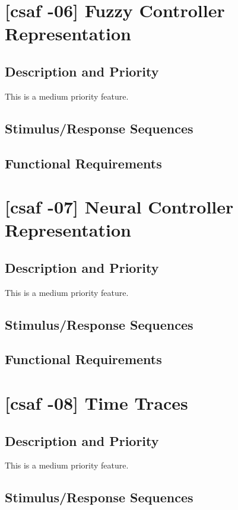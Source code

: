 \section{[\acrshort{csaf} -06] Fuzzy Controller Representation}

\subsection{Description and Priority}
This is a medium priority feature.

\subsection{Stimulus/Response Sequences}


\subsection{Functional Requirements}

\section{[\acrshort{csaf} -07] Neural Controller Representation}

\subsection{Description and Priority}
This is a medium priority feature.

\subsection{Stimulus/Response Sequences}


\subsection{Functional Requirements}

\section{[\acrshort{csaf} -08] Time Traces}

\subsection{Description and Priority}
This is a medium priority feature.

\subsection{Stimulus/Response Sequences}


